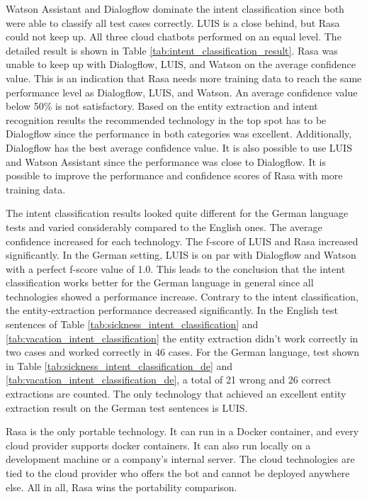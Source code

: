 Watson Assistant and Dialogflow dominate the intent classification since both were able to classify all test cases correctly.
LUIS is a close behind, but Rasa could not keep up.
All three cloud chatbots performed on an equal level.
The detailed result is shown in Table \ref{tab:intent_classification_result}.
Rasa was unable to keep up with Dialogflow, LUIS, and Watson on the  
average confidence value.
This is an indication that Rasa needs more training data to 
reach the same performance level as Dialogflow, LUIS, and Watson.
An average confidence value below 50\% is not satisfactory.
Based on the entity extraction and intent recognition results
the recommended technology in the top spot has to be Dialogflow since the performance in both categories was excellent.
Additionally, Dialogflow has the best average confidence value.
It is also possible to use LUIS and Watson Assistant since the performance was close to Dialogflow.
It is possible to improve the performance and confidence scores of Rasa with more training data.

The intent classification results looked quite different for the German language tests and varied considerably compared to the English ones.
The average confidence increased for each technology.
The f-score of LUIS and Rasa increased significantly. 
In the German setting, LUIS is on par with Dialogflow and Watson with a perfect f-score value of 1.0.
This leads to the conclusion that the intent classification works better for the German language in general since all technologies showed a performance increase.
Contrary to the intent classification, the entity-extraction performance decreased significantly.
In the English test sentences of Table \ref{tab:sickness_intent_classification} and \ref{tab:vacation_intent_classification} the entity extraction didn't work correctly in two cases and worked correctly in 46 cases.
For the German language, test shown in Table \ref{tab:sickness_intent_classification_de} and \ref{tab:vacation_intent_classification_de}, a total of 21 wrong and 26 correct extractions are counted.
The only technology that achieved an excellent entity extraction result on the German test sentences is LUIS.

Rasa is the only portable technology.
It can run in a Docker container, and every cloud provider supports docker containers.
It can also run locally on a development machine or a company's internal server.
The cloud technologies are tied to the cloud provider who offers the bot and cannot be deployed anywhere else.
All in all, Rasa wins the portability comparison.

